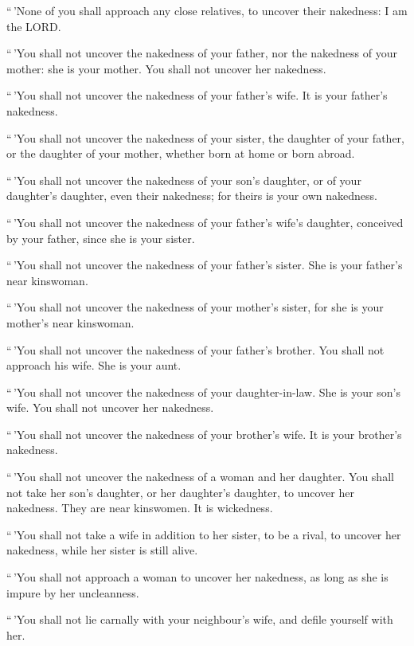  ``\,'None of you shall approach any close relatives, to
uncover their nakedness: I am the LORD.

 ``\,'You shall not uncover the nakedness of your father,
nor the nakedness of your mother: she is your mother. You shall not
uncover her nakedness.

 ``\,'You shall not uncover the nakedness of your father's
wife. It is your father's nakedness.

 ``\,'You shall not uncover the nakedness of your sister,
the daughter of your father, or the daughter of your mother, whether
born at home or born abroad.

 ``\,'You shall not uncover the nakedness of your son's
daughter, or of your daughter's daughter, even their nakedness; for
theirs is your own nakedness.

 ``\,'You shall not uncover the nakedness of your
father's wife's daughter, conceived by your father, since she is your
sister.

 ``\,'You shall not uncover the nakedness of your
father's sister. She is your father's near kinswoman.

 ``\,'You shall not uncover the nakedness of your
mother's sister, for she is your mother's near kinswoman.

 ``\,'You shall not uncover the nakedness of your
father's brother. You shall not approach his wife. She is your aunt.

 ``\,'You shall not uncover the nakedness of your
daughter-in-law. She is your son's wife. You shall not uncover her
nakedness.

 ``\,'You shall not uncover the nakedness of your
brother's wife. It is your brother's nakedness.

 ``\,'You shall not uncover the nakedness of a woman and
her daughter. You shall not take her son's daughter, or her daughter's
daughter, to uncover her nakedness. They are near kinswomen. It is
wickedness.

 ``\,'You shall not take a wife in addition to her
sister, to be a rival, to uncover her nakedness, while her sister is
still alive.

 ``\,'You shall not approach a woman to uncover her
nakedness, as long as she is impure by her uncleanness.

 ``\,'You shall not lie carnally with your neighbour's
wife, and defile yourself with her.

